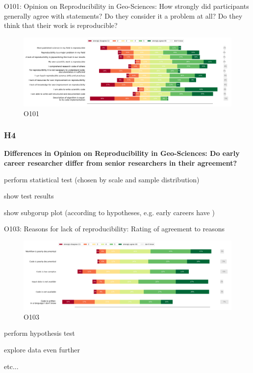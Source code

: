 \documentclass{article}
\begin{document}
O101: Opinion on Reproducibility in Geo-Sciences: How strongly did participants generally agree with statements?
Do they consider it a problem at all? Do they think that their work is reproducible?

\begin{figure}[!p]
    \centering
    \includegraphics[width=\textwidth]{../figs/O101.png}
	\caption{O101 }
    \label{fig:O101}
\end{figure}

\subsubsection{H4}
\textbf{Differences in Opinion on Reproducibility in Geo-Sciences: Do early career researcher differ from senior researchers in their agreement?}

 perform statistical test (chosen by scale and sample distribution)

 show test results

 show subgorup plot (according to hypotheses, e.g. early careers have )

O103: Reasons for lack of reproducibility: Rating of agreement to reasons

\begin{figure}[!p]
    \centering
    \includegraphics[width=\textwidth]{../figs/O103.png}
	\caption{O103 }
    \label{fig:O103}
\end{figure}

 perform hypothesis test

 explore data even further

 etc...
\end{document}
